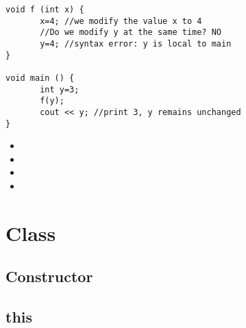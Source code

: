 \documentclass[a4paper]{article}
\begin{document}
\begin{lstlisting}
void f (int x) {
       x=4; //we modify the value x to 4
       //Do we modify y at the same time? NO
       y=4; //syntax error: y is local to main
}

void main () {
       int y=3;
       f(y);
       cout << y; //print 3, y remains unchanged
}
\end{lstlisting}

\begin{itemize}
\item
\item
\item
\item
\end{itemize}


\section{Class}
\subsection{Constructor}
\subsection{this}
\end{document}
